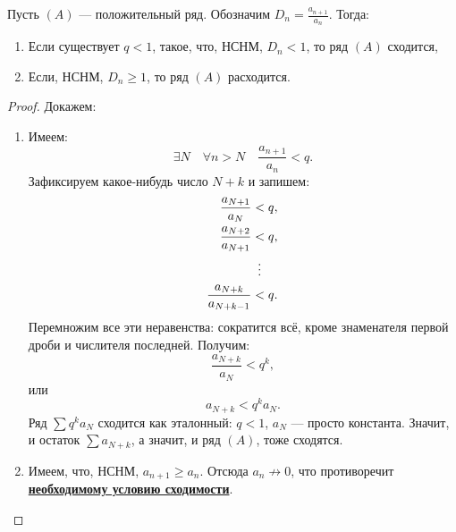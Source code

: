 \begin{theorem}[noob] \hypertarget{Даламбер-нуб}{}
	Пусть \((A)\) --- положительный ряд. Обозначим \linebreak \(D_n = \frac{a_{n+1}}{a_n}\). Тогда:
	\begin{enumerate}
		\item Если существует \(q < 1\), такое, что, НСНМ, \(D_n < 1\), то ряд \((A)\) сходится,
		\item Если, НСНМ, \(D_n \geqslant 1\), то ряд \((A)\) расходится. 
	\end{enumerate}
\end{theorem}
\begin{proof}
	Докажем:
	\begin{enumerate}
		\item Имеем: \[
			\exists N \quad \forall n > N \quad \frac{a_{n+1}}{a_n} < q.
		\]
		Зафиксируем какое-нибудь число \(N + k\) и запишем:
		\begin{align*}
			\frac{a_{N+1}}{a_N} 	  &< q, 		   \\
			\frac{a_{N+2}}{a_{N+1}}   &< q, 		   \\
									  & \enskip \vdots \\
			\frac{a_{N+k}}{a_{N+k-1}} &<q. 			   \\
		\end{align*}
		Перемножим все эти неравенства: сократится всё, кроме знаменателя первой дроби и числителя последней. Получим: \[
			\frac{a_{N+k}}{a_N} < q^k,
		\]
		или \[
			a_{N+k} < q^k a_N.
		\]
		Ряд \(\sum q^k a_N\) сходится как эталонный: \(q < 1\), \(a_N\) --- просто константа. Значит, и остаток \(\sum a_{N+k}\), а значит, и ряд \((A)\), тоже сходятся.
		\item Имеем, что, НСНМ, \(a_{n+1} \geqslant a_n\). Отсюда \(a_n \not\to 0\), что противоречит \hyperlink{необходимое условие сходимости}{\bfseries необходимому условию сходимости}.
	\end{enumerate}
\end{proof}

